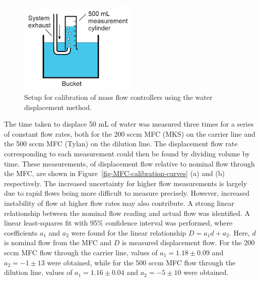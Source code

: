 \documentclass[
  a4paper,
]{scrbook}
\begin{document}
\begin{figure}

{\centering \includegraphics[width=0.5\textwidth,height=\textheight]{figures/ch8/water_displacement.png}

}

\caption[Setup for calibration of mass flow controllers using the water
displacement method.]{\label{fig-water-displacement}Setup for
calibration of mass flow controllers using the water displacement
method.}

\end{figure}

The time taken to displace 50 mL of water was measured three times for a
series of constant flow rates, both for the 200 sccm MFC (MKS) on the
carrier line and the 500 sccm MFC (Tylan) on the dilution line. The
displacement flow rate corresponding to each measurement could then be
found by dividing volume by time. These measurements, of displacement
flow relative to nominal flow through the MFC, are shown in
Figure~\ref{fig-MFC-calibration-curves} (a) and (b) respectively. The
increased uncertainty for higher flow measurements is largely due to
rapid flows being more difficult to measure precisely. However,
increased instability of flow at higher flow rates may also contribute.
A strong linear relationship between the nominal flow reading and actual
flow was identified. A linear least-squares fit with 95\% confidence
interval was performed, where coefficients \(a_1\) and \(a_2\) were
found for the linear relationship \(D = a_1d + a_2\). Here, \(d\) is
nominal flow from the MFC and \(D\) is measured displacement flow. For
the 200 sccm MFC flow through the carrier line, values of
\(a_1 = 1.18 \pm 0.09\) and \(a_2 = -1 \pm 13\) were obtained, while for
the 500 sccm MFC flow through the dilution line, values of
\(a_1 = 1.16 \pm 0.04\) and \(a_2 = -5 \pm 10\) were obtained.
\end{document}
